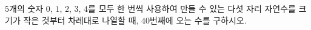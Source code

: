 $5$개의 숫자 $0$, $1$, $2$, $3$, $4$를 모두 한 번씩 사용하여 만들 수 있는 다섯 자리 자연수를 크기가 작은 것부터 차례대로 나열할 때, $40$번째에 오는 수를 구하시오.
